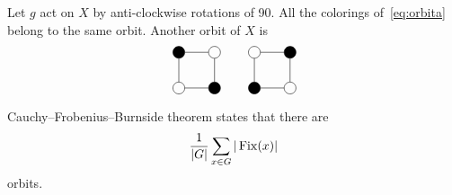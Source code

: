 \begin{example}
Let $g$ act on $X$ by anti-clockwise rotations  
of 90\textdegree. All the colorings of~\eqref{eq:orbita} belong to the same orbit. 
Another orbit of $X$ is
\[
\begin{tikzpicture}
    \node[shape=circle,draw=black,fill=black] (A) at (1,0) {};
    \node[shape=circle,draw=black] (B) at (1,1) {};
    \node[shape=circle,draw=black,fill=black] (C) at (0,1) {};
    \node[shape=circle,draw=black] (D) at (0,0) {};
    \path [-](A) edge node[left]{} (B);
    \path [-](B) edge node[left]{} (C);
    \path [-](C) edge node[left]{} (D);
    \path [-](D) edge node[left]{} (A);
\end{tikzpicture}
\qquad
\begin{tikzpicture}
    \node[shape=circle,draw=black] (A) at (1,0) {};
    \node[shape=circle,draw=black,fill=black] (B) at (1,1) {};
    \node[shape=circle,draw=black] (C) at (0,1) {};
    \node[shape=circle,draw=black,fill=black] (D) at (0,0) {};
    \path [-](A) edge node[left]{} (B);
    \path [-](B) edge node[left]{} (C);
    \path [-](C) edge node[left]{} (D);
    \path [-](D) edge node[left]{} (A);
\end{tikzpicture}
\]

Cauchy--Frobenius--Burnside theorem states that
there are  
\[
\frac{1}{|G|}\sum_{x\in G}|\operatorname{Fix}(x)|
\]
orbits. 


\end{example}
